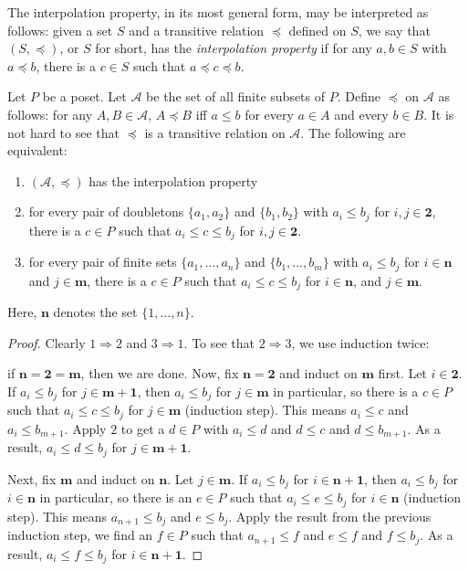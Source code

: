 \documentclass[12pt]{article}
\begin{document}
The interpolation property, in its most general form, may be interpreted as follows: given a set $S$ and a transitive relation $\preceq$ defined on $S$, we say that $(S,\preceq)$, or $S$ for short, has the \emph{interpolation property} if for any $a,b\in S$ with $a\preceq b$, there is a $c\in S$ such that $a\preceq c\preceq b$.

Let $P$ be a poset.  Let $\mathcal{A}$ be the set of all finite subsets of $P$.  Define $\preceq$ on $\mathcal{A}$ as follows: for any $A,B\in \mathcal{A}$, $A\preceq B$ iff $a\le b$ for every $a\in A$ and every $b\in B$.  It is not hard to see that $\preceq$ is a transitive relation on $\mathcal{A}$.  The following are equivalent:
\begin{enumerate}
\item $(\mathcal{A},\preceq)$ has the interpolation property
\item for every pair of doubletons $\lbrace a_1,a_2\rbrace$ and $\lbrace b_1,b_2\rbrace$ with $a_i\le b_j$ for $i,j\in \mathbf{2}$, there is a $c\in P$ such that $a_i\le c\le b_j$ for $i,j\in \mathbf{2}$.
\item for every pair of finite sets $\lbrace a_1,\ldots, a_n\rbrace$ and $\lbrace b_1,\ldots, b_m\rbrace$ with $a_i\le b_j$ for $i\in \mathbf{n}$ and $j\in \mathbf{m}$, there is a $c\in P$ such that $a_i\le c\le b_j$ for $i\in \mathbf{n}$, and $j\in \mathbf{m}$.
\end{enumerate}

Here, $\mathbf{n}$ denotes the set $\lbrace 1,\ldots,n\rbrace$.

\begin{proof}
Clearly $1\Rightarrow 2$ and $3\Rightarrow 1$.  To see that $2\Rightarrow 3$, we use induction twice: 

if $\mathbf{n}=\mathbf{2}=\mathbf{m}$, then we are done.  Now, fix $\mathbf{n}=\mathbf{2}$ and induct on $\mathbf{m}$ first.  Let $i\in \mathbf{2}$.  If $a_i\le b_j$ for $j\in \mathbf{m+1}$, then $a_i\le b_j$ for $j\in \mathbf{m}$ in particular, so there is a $c\in P$ such that $a_i\le c\le b_j$ for $j\in \mathbf{m}$ (induction step).  This means $a_i\le c$ and $a_i\le b_{m+1}$.  Apply $2$ to get a $d\in P$ with $a_i\le d$ and $d\le c$ and $d\le b_{m+1}$.  As a result, $a_i\le d\le b_j$ for $j\in \mathbf{m+1}$.  

Next, fix $\mathbf{m}$ and induct on $\mathbf{n}$.  Let $j\in \mathbf{m}$.  If $a_i\le b_j$ for $i\in \mathbf{n+1}$, then $a_i\le b_j$ for $i\in \mathbf{n}$ in particular, so there is an $e\in P$ such that $a_i\le e\le b_j$ for $i\in \mathbf{n}$ (induction step).  This means $a_{n+1}\le b_j$ and $e\le b_j$.  Apply the result from the previous induction step, we find an $f\in P$ such that $a_{n+1}\le f$ and $e\le f$ and $f\le b_j$.  As a result, $a_i\le f\le b_j$ for $i\in \mathbf{n+1}$.
\end{proof}
\end{document}
